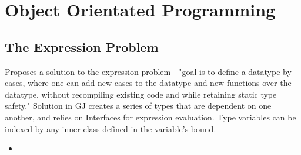 \chapter {Object Orientated Programming}

\section {The Expression Problem \cite{wadler1998expression}}
Proposes a solution to the expression problem - "goal is to define a datatype by
cases, where one can add new cases to the datatype and new functions over the
datatype, without recompiling existing code and while retaining static type
safety." Solution in GJ creates a series of types that are dependent on one
another, and relies on Interfaces for expression evaluation. Type variables can
be indexed by any inner class defined in the variable's bound.
\begin{itemize}
    \item {}
\end{itemize}